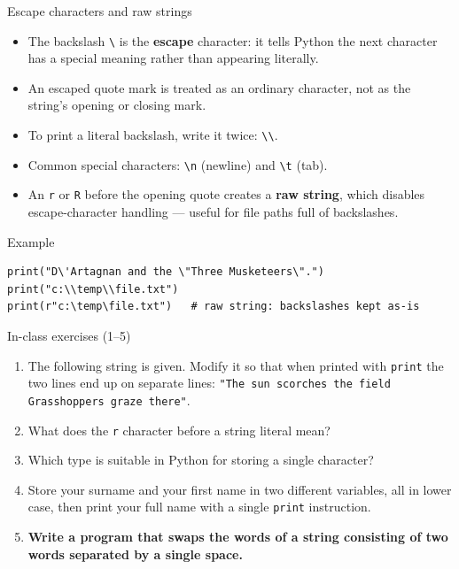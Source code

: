 \documentclass[aspectratio=169,11pt]{beamer}
\begin{document}
\begin{frame}[fragile]{Escape characters and raw strings}
  \begin{itemize}
    \item The backslash \texttt{\textbackslash} is the \textbf{escape}
          character: it tells Python the next character has a special meaning
          rather than appearing literally.
    \item An escaped quote mark is treated as an ordinary character, not as
          the string's opening or closing mark.
    \item To print a literal backslash, write it twice: \texttt{\textbackslash\textbackslash}.
    \item Common special characters: \texttt{\textbackslash n} (newline) and
          \texttt{\textbackslash t} (tab).
    \item An \texttt{r} or \texttt{R} before the opening quote creates a
          \textbf{raw string}, which disables escape-character handling ---
          useful for file paths full of backslashes.
  \end{itemize}
  \begin{block}{Example}
\begin{verbatim}
print("D\'Artagnan and the \"Three Musketeers\".")
print("c:\\temp\\file.txt")
print(r"c:\temp\file.txt")   # raw string: backslashes kept as-is
\end{verbatim}
  \end{block}
\end{frame}


\begin{frame}{In-class exercises (1--5)}
  \small
  \begin{enumerate}
    \item The following string is given. Modify it so that when printed with
          \texttt{print} the two lines end up on separate lines:
          \texttt{"The sun scorches the field Grasshoppers graze there"}.
        \item What does the \texttt{r} character before a string literal mean?
        \item Which type is suitable in Python for storing a single character?
        \item Store your surname and your first name in two different variables,
          all in lower case, then print your full name with a single
          \texttt{print} instruction.
    \item \textbf{Write a program that swaps the words of a string consisting
      of two words separated by a single space.}
  \end{enumerate}
\end{frame}
\end{document}
